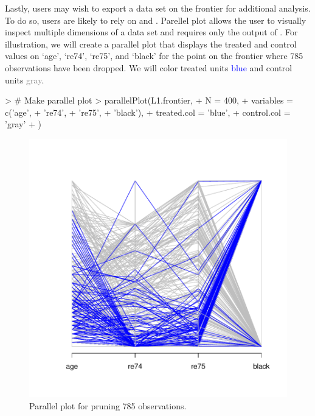 \documentclass[nojss]{jss}
\begin{document}
Lastly, users may wish to export a data set on the frontier for
additional analysis. To do so, users are likely to rely on
 and . Parellel plot
allows the user to visually inspect multiple dimensions of a data set
and requires only the output of . For
illustration, we will create a parallel plot that displays 
the treated and control values on `age', `re74', `re75', and
`black' for the point on the frontier where 785 observations
have been dropped. We will color treated units \textcolor{blue}{blue}
and control units \textcolor{gray}{gray}.

\begin{minipage}{0.45\textwidth}
\begin{Schunk}
\begin{Sinput}
> # Make parallel plot
> parallelPlot(L1.frontier,
+              N = 400,
+              variables = c('age',
+              're74',
+              're75',
+              'black'),
+              treated.col = 'blue',
+              control.col = 'gray'
+              )
\end{Sinput}
\end{Schunk}
\end{minipage}
\begin{minipage}{0.5\textwidth}
\begin{figure}[H]
\includegraphics{Using_MatchingFrontier-mahal_parplot.pdf}
\caption{\label{fig:mahal_parplot} Parallel plot for pruning 785 observations.}
\end{figure}
\end{minipage} \hfill
\end{document}
